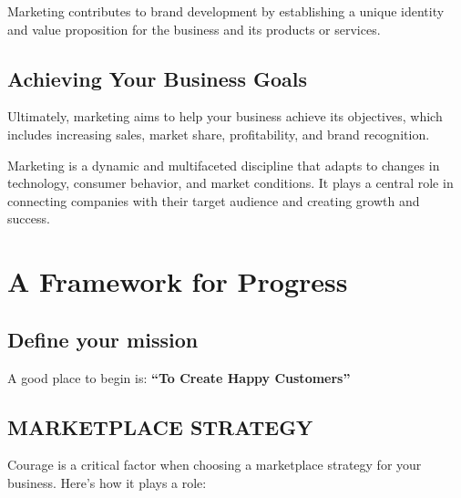 \documentclass[
]{book}
\begin{document}
Marketing contributes to brand development by establishing a unique identity and value proposition for the business and its products or services.

\hypertarget{achieving-your-business-goals}{%
\section{\texorpdfstring{\textbf{Achieving Your Business Goals}}{Achieving Your Business Goals}}\label{achieving-your-business-goals}}

Ultimately, marketing aims to help your business achieve its objectives, which includes increasing sales, market share, profitability, and brand recognition.

Marketing is a dynamic and multifaceted discipline that adapts to changes in technology, consumer behavior, and market conditions. It plays a central role in connecting companies with their target audience and creating growth and success.

\hypertarget{a-framework-for-progress}{%
\chapter{A Framework for Progress}\label{a-framework-for-progress}}

\hypertarget{define-your-mission}{%
\section{Define your mission}\label{define-your-mission}}

A good place to begin is: \textbf{``To Create Happy Customers''}

\hypertarget{marketplace-strategy}{%
\section{MARKETPLACE STRATEGY}\label{marketplace-strategy}}

Courage is a critical factor when choosing a marketplace strategy for your business. Here's how it plays a role:
\end{document}
